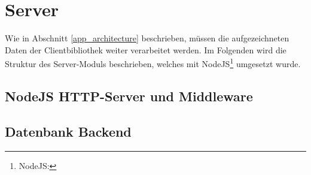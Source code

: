 \section{Server}
\label{server}
Wie in Abschnitt \ref{app_architecture} beschrieben, müssen die aufgezeichneten Daten der Clientbibliothek weiter verarbeitet werden. Im Folgenden wird die Struktur des Server-Moduls beschrieben, welches mit NodeJS\footnote{NodeJS: } umgesetzt wurde.
\subsection{NodeJS HTTP-Server und Middleware}

\subsection{Datenbank Backend}